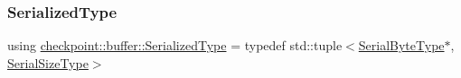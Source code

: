 \mbox{\label{namespacecheckpoint_1_1buffer_a641e3b257ab05f90165ed4139db8a84a}} 
\subsubsection{\texorpdfstring{Serialized\+Type}{SerializedType}}
{\footnotesize\ttfamily using \hyperlink{namespacecheckpoint_1_1buffer_a641e3b257ab05f90165ed4139db8a84a}{checkpoint\+::buffer\+::\+Serialized\+Type} = typedef std\+::tuple$<$\hyperlink{namespacecheckpoint_ae57f01cdc0b81776c23b6c7c934c58f5}{Serial\+Byte\+Type}$\ast$, \hyperlink{namespacecheckpoint_a083f6674da3f94c2901b18c6d238217c}{Serial\+Size\+Type}$>$}

